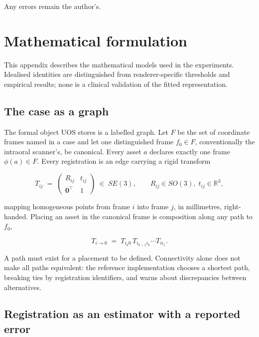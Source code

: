 \documentclass[11pt,a4paper]{article}
\begin{document}
Any errors remain the author's.


\appendix
\newpage

\section{Mathematical formulation}\label{app:math}

This appendix describes the mathematical models used in the experiments. Idealised
identities are distinguished from renderer-specific thresholds and empirical results;
none is a clinical validation of the fitted representation.

\subsection{The case as a graph}\label{app:graph}

The formal object UOS stores is a labelled graph. Let $F$ be the set of coordinate frames
named in a case and let one distinguished frame $f_0 \in F$, conventionally the intraoral
scanner's, be canonical. Every asset $a$ declares exactly one frame $\phi(a) \in F$.
Every registration is an edge carrying a rigid transform

\[
  T_{ij} \;=\;
  \begin{pmatrix} R_{ij} & t_{ij} \\ \mathbf{0}^{\!\top} & 1 \end{pmatrix}
  \;\in\; SE(3), \qquad R_{ij} \in SO(3),\; t_{ij} \in \mathbb{R}^3 ,
\]

mapping homogeneous points from frame $i$ into frame $j$, in millimetres, right-handed.
Placing an asset in the canonical frame is composition along any path to $f_0$,

\[
  T_{i \to 0} \;=\; T_{i_k 0} \, T_{i_{k-1} i_k} \cdots T_{i i_1}.
\]

A path must exist for a placement to be defined. Connectivity alone does not make all
paths equivalent: the reference implementation chooses a shortest path, breaking ties by
registration identifiers, and warns about discrepancies between alternatives.

\subsection{Registration as an estimator with a reported error}\label{app:icp}
\end{document}
